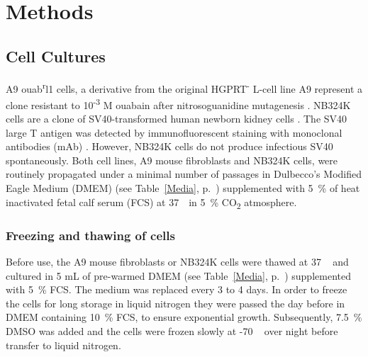 
\chapter{Methods} %

\label{ChapterX} %



\section{Cell Cultures}
A9 ouab\textsuperscript{r}l1 cells, a derivative from the original HGPRT\textsuperscript{-} L-cell line A9 represent a clone resistant to 10\textsuperscript{-3} M ouabain after nitrosoguanidine mutagenesis \cite{pmid6602222, pmid14213660}.
NB324K cells are a clone of SV40-transformed  human newborn kidney cells \cite{pmid13911591}. The SV40 large T antigen was detected by immunofluorescent  staining with monoclonal antibodies (mAb) \cite{pmid6169844}.  However, NB324K cells do not produce infectious SV40 spontaneously.
Both cell lines, A9 mouse fibroblasts and NB324K cells, were routinely propagated under a minimal number of passages in Dulbecco's Modified Eagle Medium (DMEM) (see Table~\ref{Media}, p.~\pageref{Media}) supplemented with 5~\% of heat inactivated fetal calf serum (FCS) at 37~\textcelsius~in 5~\% CO\textsubscript{2} atmosphere.


\subsection{Freezing and thawing of cells}
Before use, the A9 mouse fibroblasts or NB324K cells were thawed at 37 \textcelsius~ and cultured in 5 mL of pre-warmed DMEM (see Table~\ref{Media}, p.~\pageref{Media}) supplemented with 5~\% FCS. The medium was replaced every 3 to 4 days. 
In order to freeze the cells for long storage in liquid nitrogen they were passed the day before in DMEM containing 10~\% FCS, to ensure exponential growth. Subsequently, 7.5~\% DMSO was added and the cells were frozen slowly at -70 \textcelsius~ over night before transfer to liquid nitrogen.

